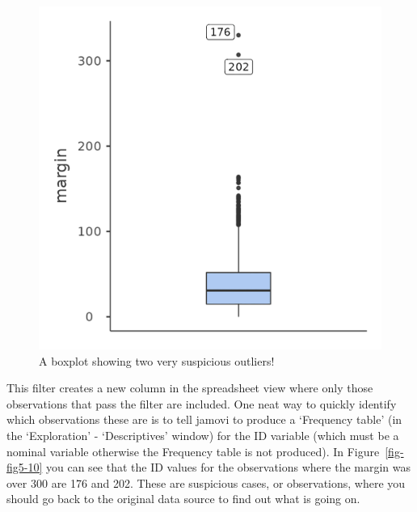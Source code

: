 \documentclass[
  a4paper,
]{book}
\begin{document}
\begin{figure}

\includegraphics[width=1\textwidth,height=\textheight]{images/fig5-8.png} \hfill{}

\caption{\label{fig-fig5-8}A boxplot showing two very suspicious
outliers!}

\end{figure}

This filter creates a new column in the spreadsheet view where only
those observations that pass the filter are included. One neat way to
quickly identify which observations these are is to tell jamovi to
produce a `Frequency table' (in the `Exploration' - `Descriptives'
window) for the ID variable (which must be a nominal variable otherwise
the Frequency table is not produced). In Figure~\ref{fig-fig5-10} you
can see that the ID values for the observations where the margin was
over 300 are 176 and 202. These are suspicious cases, or observations,
where you should go back to the original data source to find out what is
going on.
\end{document}
